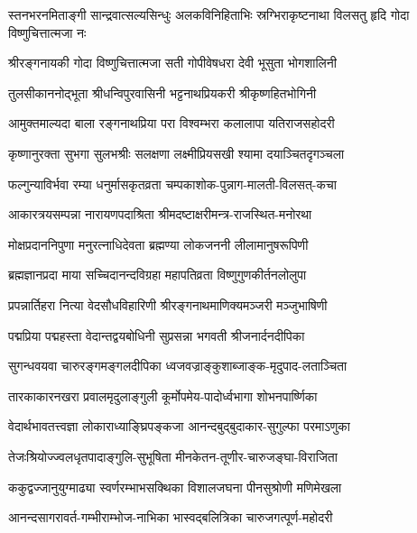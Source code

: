 

{स्तनभरनमिताङ्गी  सान्द्रवात्सल्यसिन्धुः}
{अलकविनिहिताभिः  स्रग्भिराकृष्टनाथा}
{विलसतु  हृदि  गोदा  विष्णुचित्तात्मजा  नः}

\twolineshloka
{श्रीरङ्गनायकी  गोदा विष्णुचित्तात्मजा सती}
{गोपीवेषधरा  देवी  भूसुता  भोगशालिनी}%

\twolineshloka
{तुलसीकाननोद्भूता  श्रीधन्विपुरवासिनी}
{भट्टनाथप्रियकरी  श्रीकृष्णहितभोगिनी}%

\twolineshloka
{आमुक्तमाल्यदा  बाला  रङ्गनाथप्रिया  परा}
{विश्वम्भरा  कलालापा  यतिराजसहोदरी}%

\twolineshloka
{कृष्णानुरक्ता  सुभगा  सुलभश्रीः  सलक्षणा}
{लक्ष्मीप्रियसखी  श्यामा  दयाञ्चितदृगञ्चला}%

\twolineshloka
{फल्गुन्याविर्भवा  रम्या  धनुर्मासकृतव्रता}
{चम्पकाशोक-पुन्नाग-मालती-विलसत्-कचा}%

\twolineshloka
{आकारत्रयसम्पन्ना  नारायणपदाश्रिता}
{श्रीमदष्टाक्षरीमन्त्र-राजस्थित-मनोरथा}%

\twolineshloka
{मोक्षप्रदाननिपुणा  मनुरत्नाधिदेवता}
{ब्रह्मण्या  लोकजननी  लीलामानुषरूपिणी}%

\twolineshloka
{ब्रह्मज्ञानप्रदा माया  सच्चिदानन्दविग्रहा}
{महापतिव्रता  विष्णुगुणकीर्तनलोलुपा}%

\twolineshloka
{प्रपन्नार्तिहरा  नित्या  वेदसौधविहारिणी}
{श्रीरङ्गनाथमाणिक्यमञ्जरी  मञ्जुभाषिणी}%

\twolineshloka
{पद्मप्रिया पद्महस्ता वेदान्तद्वयबोधिनी}
{सुप्रसन्ना भगवती श्रीजनार्दनदीपिका}%

\twolineshloka
{सुगन्धवयवा चारुरङ्गमङ्गलदीपिका}
{ध्वजवज्राङ्कुशाब्जाङ्क-मृदुपाद-लताञ्चिता}%

\twolineshloka
{तारकाकारनखरा  प्रवालमृदुलाङ्गुली}
{कूर्मोपमेय-पादोर्ध्वभागा  शोभनपार्ष्णिका}%

\twolineshloka
{वेदार्थभावतत्त्वज्ञा लोकाराध्याङ्घ्रिपङ्कजा}
{आनन्दबुद्बुदाकार-सुगुल्फा  परमाऽणुका}%

\twolineshloka
{तेजःश्रियोज्ज्वलधृतपादाङ्गुलि-सुभूषिता}
{मीनकेतन-तूणीर-चारुजङ्घा-विराजिता}%

\twolineshloka
{ककुद्वज्जानुयुग्माढ्या  स्वर्णरम्भाभसक्थिका}
{विशालजघना  पीनसुश्रोणी  मणिमेखला}%

\twolineshloka
{आनन्दसागरावर्त-गम्भीराम्भोज-नाभिका}
{भास्वद्बलित्रिका  चारुजगत्पूर्ण-महोदरी}%

